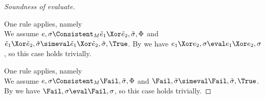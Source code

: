\begin{proof}[Soundness of evaluate]
{    }

    {  One rule applies, namely \\
    We assume $e,\sigma\Consistent_M\tilde{e}_1\Xor \tilde{e}_2,\tilde{\sigma},\Phi$ and $\tilde{e}_1\Xor \tilde{e}_2,\tilde{\sigma}\simeval\tilde{e}_1\Xor \tilde{e}_2,\tilde{\sigma},\True$.
    By  we have $e_1\Xor e_2,\sigma\eval e_1\Xor e_2,\sigma$, so this case holds trivially.

    }

    {  One rule applies, namely \\
    We assume $e,\sigma\Consistent_M\Fail,\tilde{\sigma},\Phi$ and $\Fail,\tilde{\sigma}\simeval\Fail,\tilde{\sigma},\True$.
    By  we have $\Fail,\sigma\eval \Fail,\sigma$, so this case holds trivially.

    }

\end{proof}
